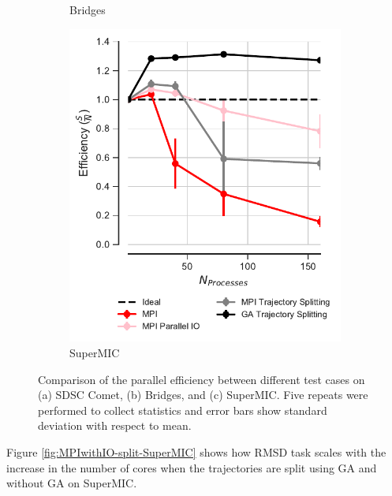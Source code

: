 \begin{figure}[ht!]
\begin{subfigure}{.35\textwidth}
  \caption{Bridges}
  \label{fig:comparison_efficiency_Bridges}
\end{subfigure}
\hfill
\begin{subfigure}{.3\textwidth}
  \includegraphics[width=\linewidth]{figures/Comparison_Efficiency_all_SuperMIC.pdf}
  \caption{SuperMIC}
  \label{fig:comparison_efficiency_SuperMIC}
\end{subfigure}

\caption{Comparison of the parallel efficiency between different test cases on (a) SDSC Comet, (b) Bridges, and (c) SuperMIC.
Five repeats were performed to collect statistics and error bars show standard deviation with respect to mean.}
\label{fig:comparison_efficiency_clusters}
\end{figure} 

Figure \ref{fig:MPIwithIO-split-SuperMIC} shows how RMSD task scales with the increase in the number of cores when the trajectories are split using GA and without GA on SuperMIC.  
 
